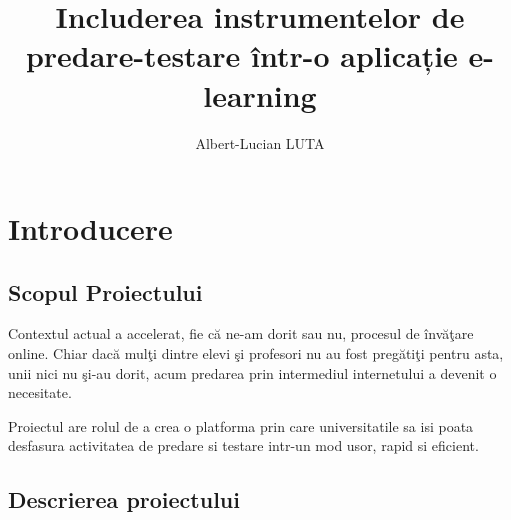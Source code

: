 \documentclass[12pt, a4paper, oneside, romanian]{teza-upb}
\begin{document}
\author{Albert-Lucian LUTA}

\title{Includerea instrumentelor de predare-testare într-o aplicație e-learning}




\beforepreface
\listoffigures
\listoftables
{}
\afterpreface 

\chapter*{Introducere}

\section{Scopul Proiectului}

Contextul actual a accelerat, fie că ne-am dorit sau nu, procesul de învăţare online. Chiar dacă mulţi dintre elevi şi profesori nu au fost pregătiţi pentru asta, unii nici nu şi-au dorit, acum predarea prin intermediul internetului a devenit o necesitate.\cite{liferoplatform}

Proiectul are rolul de a crea o platforma prin care universitatile sa isi poata desfasura activitatea de predare si testare intr-un mod usor, rapid si eficient.

\section{Descrierea proiectului}
\end{document}
